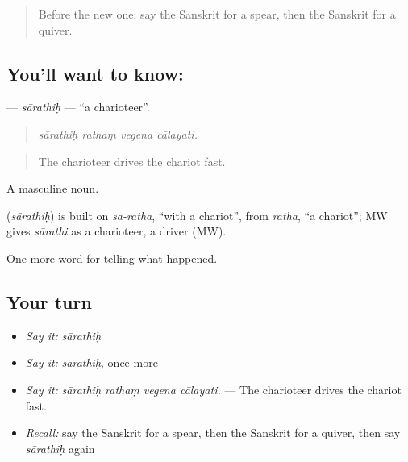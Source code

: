 \begin{quote}
Before the new one: say the Sanskrit for a spear, then the Sanskrit for a quiver.
\end{quote}

\subsection*{You'll want to know: }
\textbf{} — \emph{sārathiḥ} — \textquotedblleft{}a charioteer\textquotedblright{}.

\begin{quote}
   
\end{quote}

\begin{quote}
\emph{sārathiḥ rathaṃ vegena cālayati.}
\end{quote}

\begin{quote}
The charioteer drives the chariot fast.
\end{quote}

A masculine noun.

\begin{cousinweb}
\textbf{} (\emph{sārathiḥ}) is built on \emph{sa-ratha}, \textquotedblleft{}with a chariot\textquotedblright{}, from \emph{ratha}, \textquotedblleft{}a chariot\textquotedblright{}; MW gives \emph{sārathi} as a charioteer, a driver (MW).
\end{cousinweb}

\begin{grammarlens}[title={What you've built}]
One more word for telling what happened.
\end{grammarlens}

\subsection*{Your turn}
\begin{itemize}
\raggedright
  \item \emph{Say it:} \emph{sārathiḥ}
  \item \emph{Say it:} \emph{sārathiḥ}, once more
  \item \emph{Say it:} \emph{sārathiḥ rathaṃ vegena cālayati.} — The charioteer drives the chariot fast.
  \item \emph{Recall:} say the Sanskrit for a spear, then the Sanskrit for a quiver, then say \emph{sārathiḥ} again
\end{itemize}

